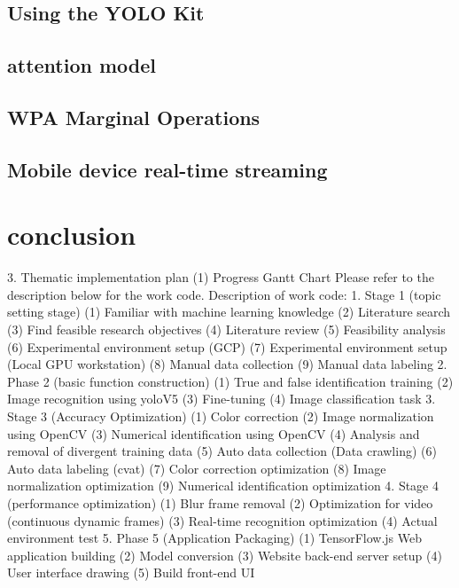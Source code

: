 \documentclass{article}
\begin{document}
\subsection{Using the YOLO Kit}
\subsection{attention model}
\subsection{WPA Marginal Operations}
\subsection{Mobile device real-time streaming}


\section{conclusion}
3. Thematic implementation plan
(1) Progress Gantt Chart
Please refer to the description below for the work code.
Description of work code:
1. Stage 1 (topic setting stage)
(1) Familiar with machine learning knowledge
(2) Literature search
(3) Find feasible research objectives
(4) Literature review
(5) Feasibility analysis
(6) Experimental environment setup (GCP)
(7) Experimental environment setup (Local GPU workstation)
(8) Manual data collection
(9) Manual data labeling
2. Phase 2 (basic function construction)
(1) True and false identification training
(2) Image recognition using yoloV5
(3) Fine-tuning
(4) Image classification task
3. Stage 3 (Accuracy Optimization)
(1) Color correction
(2) Image normalization using OpenCV
(3) Numerical identification using OpenCV
(4) Analysis and removal of divergent training data
(5) Auto data collection (Data crawling)
(6) Auto data labeling (cvat)
(7) Color correction optimization
(8) Image normalization optimization
(9) Numerical identification optimization
4. Stage 4 (performance optimization)
(1) Blur frame removal
(2) Optimization for video (continuous dynamic frames)
(3) Real-time recognition optimization
(4) Actual environment test
5. Phase 5 (Application Packaging)
(1) TensorFlow.js Web application building
(2) Model conversion
(3) Website back-end server setup
(4) User interface drawing
(5) Build front-end UI
\end{document}
